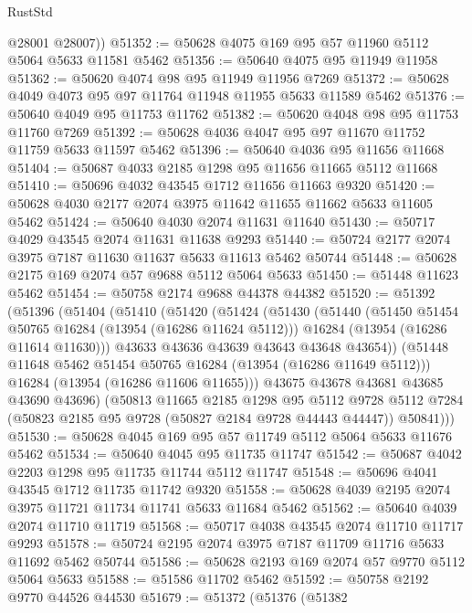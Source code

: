 \begin{lexlean}{RustStd}
\begin{coremodule}
        @28001
        @28007))
@51352 := @50628 @4075 @169 @95 @57 @11960 @5112 @5064 @5633 @11581 @5462
@51356 := @50640 @4075 @95 @11949 @11958
@51362 := @50620 @4074 @98 @95 @11949 @11956 @7269
@51372 := @50628 @4049 @4073 @95 @97 @11764 @11948 @11955 @5633 @11589 @5462
@51376 := @50640 @4049 @95 @11753 @11762
@51382 := @50620 @4048 @98 @95 @11753 @11760 @7269
@51392 := @50628 @4036 @4047 @95 @97 @11670 @11752 @11759 @5633 @11597 @5462
@51396 := @50640 @4036 @95 @11656 @11668
@51404 := @50687 @4033 @2185 @1298 @95 @11656 @11665 @5112 @11668
@51410 := @50696 @4032 @43545 @1712 @11656 @11663 @9320
@51420 := @50628 @4030 @2177 @2074 @3975 @11642 @11655 @11662 @5633 @11605 @5462
@51424 := @50640 @4030 @2074 @11631 @11640
@51430 := @50717 @4029 @43545 @2074 @11631 @11638 @9293
@51440 := @50724 @2177 @2074 @3975 @7187 @11630 @11637 @5633 @11613 @5462 @50744
@51448 := @50628 @2175 @169 @2074 @57 @9688 @5112 @5064 @5633
@51450 := @51448 @11623 @5462
@51454 := @50758 @2174 @9688 @44378 @44382
@51520 := @51392
    (@51396
      (@51404
        (@51410
          (@51420
            (@51424
              (@51430
                (@51440
                  (@51450 @51454 @50765 @16284 (@13954 (@16286 @11624 @5112)))
                  @16284
                  (@13954 (@16286 @11614 @11630)))
                @43633
                @43636
                @43639
                @43643
                @43648
                @43654))
            (@51448 @11648 @5462 @51454 @50765 @16284 (@13954 (@16286 @11649 @5112)))
            @16284
            (@13954 (@16286 @11606 @11655)))
          @43675
          @43678
          @43681
          @43685
          @43690
          @43696)
        (@50813
          @11665
          @2185
          @1298
          @95
          @5112
          @9728
          @5112
          @7284
          (@50823 @2185 @95 @9728 (@50827 @2184 @9728 @44443 @44447))
          @50841)))
@51530 := @50628 @4045 @169 @95 @57 @11749 @5112 @5064 @5633 @11676 @5462
@51534 := @50640 @4045 @95 @11735 @11747
@51542 := @50687 @4042 @2203 @1298 @95 @11735 @11744 @5112 @11747
@51548 := @50696 @4041 @43545 @1712 @11735 @11742 @9320
@51558 := @50628 @4039 @2195 @2074 @3975 @11721 @11734 @11741 @5633 @11684 @5462
@51562 := @50640 @4039 @2074 @11710 @11719
@51568 := @50717 @4038 @43545 @2074 @11710 @11717 @9293
@51578 := @50724 @2195 @2074 @3975 @7187 @11709 @11716 @5633 @11692 @5462 @50744
@51586 := @50628 @2193 @169 @2074 @57 @9770 @5112 @5064 @5633
@51588 := @51586 @11702 @5462
@51592 := @50758 @2192 @9770 @44526 @44530
@51679 := @51372
    (@51376
      (@51382

\end{coremodule}
\end{lexlean}
